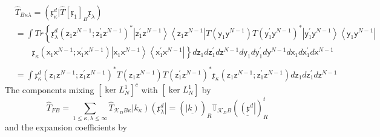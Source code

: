 \documentclass[aps,preprint]{revtex4}%
\begin{document}
\begin{align}
&  \hat{T}_{B\kappa\lambda}=\left(  \mathfrak{x}_{\kappa}^{d}|\hat{T}\left[
\mathfrak{x}_{1}\right]  _{B}\mathfrak{x}_{\lambda}\right) \nonumber\\
&  =%
{\displaystyle\int}
Tr\left\{  \mathfrak{x}_{\lambda}^{d}\left(  \mathsf{z}_{1}\mathsf{z}%
^{N-1};\mathsf{z}_{1}^{\prime}\mathsf{z}^{N-1}\right)  ^{\ast}\left\vert
\mathsf{z}_{1}^{\prime}\mathsf{z}^{N-1}\right\rangle \left\langle
\mathsf{z}_{1}\mathsf{z}^{N-1}\right\vert T\left(  \mathsf{y}_{1}%
\mathsf{y}^{N-1}\right)  T\left(  \mathsf{y}_{1}^{\prime}\mathsf{y}%
^{N-1}\right)  ^{\ast}\left\vert \mathsf{y}_{1}^{\prime}\mathsf{y}%
^{N-1}\right\rangle \left\langle \mathsf{y}_{1}\mathsf{y}^{N-1}\right\vert
\right. \nonumber\\
&  \qquad\left.  \mathfrak{x}_{\kappa}\left(  \mathsf{x}_{1}\mathsf{x}%
^{N-1};\mathsf{x}_{1}^{\prime}\mathsf{x}^{N-1}\right)  \left\vert
\mathsf{x}_{1}\mathsf{x}^{N-1}\right\rangle \left\langle \mathsf{x}%
_{1}^{\prime}\mathsf{x}^{N-1}\right\vert \right\}  d\mathsf{z}_{1}%
d\mathsf{z}_{1}^{\prime}d\mathsf{z}^{N-1}d\mathsf{y}_{1}d\mathsf{y}%
_{1}^{\prime}d\mathsf{y}^{N-1}d\mathsf{x}_{1}d\mathsf{x}_{1}^{\prime
}d\mathsf{x}^{N-1}\nonumber\\
& \nonumber\\
&  =%
{\displaystyle\int}
\mathfrak{x}_{\kappa}^{d}\left(  \mathsf{z}_{1}\mathsf{z}^{N-1};\mathsf{z}%
_{1}^{\prime}\mathsf{z}^{N-1}\right)  ^{\ast}T\left(  \mathsf{z}_{1}%
\mathsf{z}^{N-1}\right)  T\left(  \mathsf{z}_{1}^{\prime}\mathsf{z}%
^{N-1}\right)  ^{\ast}\mathfrak{x}_{\kappa}\left(  \mathsf{z}_{1}%
\mathsf{z}^{N-1};\mathsf{z}_{1}^{\prime}\mathsf{z}^{N-1}\right)
d\mathsf{z}_{1}d\mathsf{z}_{1}^{\prime}d\mathsf{z}^{N-1}%
\end{align}
The components mixing $\left[  \ker L_{N}^{1}\right]  ^{c}$ with $\left[  \ker
L_{N}^{1}\right]  $ by
\begin{equation}
\hat{T}_{FB}=%
{\displaystyle\sum\limits_{1\leq\kappa,\lambda\leq\infty}}
\hat{T}_{\mathcal{K}_{D}B\kappa}\left\vert k_{\kappa}\right)  \left(
\mathfrak{x}_{\lambda}^{d}\right\vert =\left(  \underline{\left\vert k\right)
}\right)  _{R}\mathbb{T}_{\mathcal{K}_{D}B}\left(  \underline{\left(
\mathfrak{x}^{d}\right\vert }\right)  _{R}^{t}%
\end{equation}
and the expansion coefficients by
\end{document}
